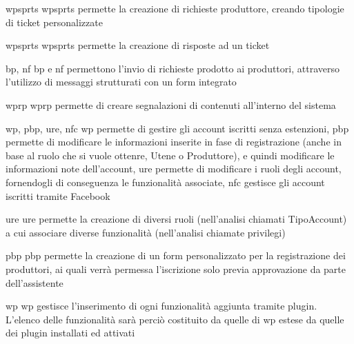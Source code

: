 
{\acrlong{wpsprts}}
{\acrlong{wpsprts} permette la creazione di richieste produttore, creando tipologie di ticket personalizzate}


{\acrlong{wpsprts}}
{\acrlong{wpsprts} permette la creazione di risposte ad un ticket}


{\acrlong{bp}, \acrlong{nf}}
{\acrlong{bp} e \acrlong{nf} permettono l'invio di richieste prodotto ai produttori, attraverso l'utilizzo di messaggi strutturati con un form integrato}


{\acrlong{wprp}}
{\acrlong{wprp} permette di creare segnalazioni di contenuti all'interno del sistema}


{\acrlong{wp}, \acrlong{pbp}, \acrlong{ure}, \acrlong{nfc}}
{\acrlong{wp} permette di gestire gli account iscritti senza estenzioni, \acrlong{pbp} permette di modificare le informazioni inserite in fase di registrazione (anche in base al ruolo che si vuole ottenre, Utene o Produttore), e quindi modificare le informazioni note dell'account, \acrlong{ure} permette di modificare i ruoli degli account, fornendogli di conseguenza le funzionalità associate, \acrlong{nfc} gestisce gli account iscritti tramite Facebook}


{\acrlong{ure}}
{\acrlong{ure} permette la creazione di diversi ruoli (nell'analisi chiamati TipoAccount) a cui associare diverse funzionalità (nell'analisi chiamate privilegi)}


{\acrlong{pbp}}
{\acrlong{pbp} permette la creazione di un form personalizzato per la registrazione dei produttori, ai quali verrà permessa l'iscrizione solo previa approvazione da parte dell'assistente}


{\acrlong{wp}}
{\acrlong{wp} gestisce l'inserimento di ogni funzionalità aggiunta tramite plugin. L'elenco delle funzionalità sarà perciò costituito da quelle di \acrlong{wp} estese da quelle dei plugin installati ed attivati}

